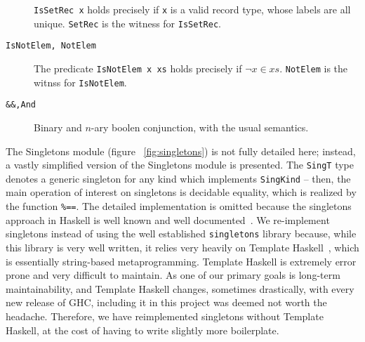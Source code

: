 \begin{description}
            \lstinline{IsSetRec x} holds precisely if 
            \lstinline{x}
            is a valid record type, whose labels are all 
            unique. \lstinline{SetRec} is the witness for 
            \lstinline{IsSetRec}. 
            \item[\texttt{IsNotElem, NotElem}] The predicate 
            \lstinline{IsNotElem x xs} holds precisely if 
            $\lnot x \in xs$.
            \lstinline{NotElem} is the witnss for 
            \lstinline{IsNotElem}. 
            \item[\texttt{\&\&,And}] Binary and $n$-ary boolen 
            conjunction, with the usual semantics. 
        \end{description}
        
        
        \label{subsec:Singletons}
        
        The Singletons module (figure ~\ref{fig:singletons}) is 
        not fully detailed here;
        instead, a vastly simplified version of the Singletons 
        module is presented. The
        \lstinline{SingT} type denotes a generic singleton for 
        any kind which implements
        \lstinline{SingKind} -- then, the main operation of 
        interest on singletons is
        decidable equality, which is realized by the function 
        \lstinline{%==}. The
            detailed implementation is omitted because the 
            singletons approach in Haskell
            is well known and well 
            documented~\cite{singletons}. We re-implement
            singletons instead of using the well established 
            \texttt{singletons} library
            because, while this library is very well written, 
            it relies very heavily on
            Template Haskell~\cite{th}, which is essentially 
            string-based
            metaprogramming. Template Haskell is extremely 
            error prone and very difficult
            to maintain. As one of our primary goals is 
            long-term maintainability, and
            Template Haskell changes, sometimes drastically, 
            with every new release of
            GHC, including it in this project was deemed not 
            worth the
            headache. Therefore, we have reimplemented 
            singletons without Template
            Haskell, at the cost of having to write slightly 
            more boilerplate.
            
            


